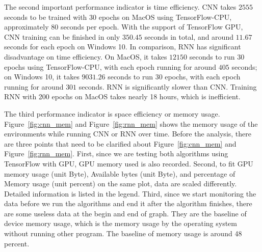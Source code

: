 \documentclass[letterpaper]{article} %
\begin{document}
	The second important performance indicator is time efficiency. CNN takes $2555$ seconds to be trained with $30$ epochs on MacOS using TensorFlow-CPU, approximately 80 seconds per epoch. With the support of TensorFlow GPU, CNN training can be finished in only $350.45$ seconds in total, and around $11.67$ seconds for each epoch on Windows 10. In comparison, RNN has significant disadvantage on time efficiency. On MacOS, it takes $12150$ seconds to run $30$ epochs using TensorFlow-CPU, with each epoch running for around $405$ seconds; on Windows 10, it takes $9031.26$ seconds to run 30 epochs, with each epoch running for around $301$ seconds. RNN is significantly slower than CNN. Training RNN with 200 epochs on MacOS takes nearly 18 hours, which is inefficient.
	
	The third performance indicator is space efficiency or memory usage. Figure~\ref{fig:cnn_mem} and Figure~\ref{fig:rnn_mem} shows the memory usage of the environments while running CNN or RNN over time. Before the analysis, there are three points that need to be clarified about Figure~\ref{fig:cnn_mem} and Figure~\ref{fig:rnn_mem}. First, since we are testing both algorithms using TensorFlow with GPU, GPU memory used is also recorded. Second, to fit GPU memory usage (unit Byte), Available bytes (unit Byte), and percentage of Memory usage (unit percent) on the same plot, data are scaled differently. Detailed information is listed in the legend. Third, since we start monitoring the data before we run the algorithms and end it after the algorithm finishes, there are some useless data at the begin and end of graph. They are the baseline of device memory usage, which is the memory usage by the operating system without running other program. The baseline of memory usage is around 48 percent. 
	
\end{document}
